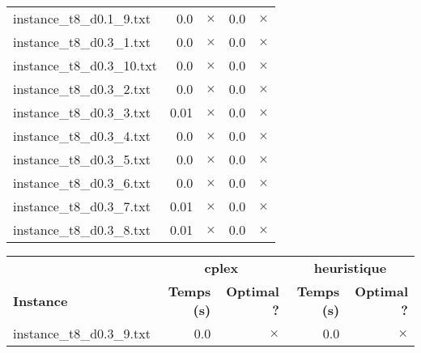 \documentclass{article}
\begin{document}
\begin{center}
\begin{tabular}{lrrrr}
instance\_t8\_d0.1\_9.txt & 0.0 & 
$\times$
 & 0.0 & 
$\times$
\\
instance\_t8\_d0.3\_1.txt & 0.0 & 
$\times$
 & 0.0 & 
$\times$
\\
instance\_t8\_d0.3\_10.txt & 0.0 & 
$\times$
 & 0.0 & 
$\times$
\\
instance\_t8\_d0.3\_2.txt & 0.0 & 
$\times$
 & 0.0 & 
$\times$
\\
instance\_t8\_d0.3\_3.txt & 0.01 & 
$\times$
 & 0.0 & 
$\times$
\\
instance\_t8\_d0.3\_4.txt & 0.0 & 
$\times$
 & 0.0 & 
$\times$
\\
instance\_t8\_d0.3\_5.txt & 0.0 & 
$\times$
 & 0.0 & 
$\times$
\\
instance\_t8\_d0.3\_6.txt & 0.0 & 
$\times$
 & 0.0 & 
$\times$
\\
instance\_t8\_d0.3\_7.txt & 0.01 & 
$\times$
 & 0.0 & 
$\times$
\\
instance\_t8\_d0.3\_8.txt & 0.01 & 
$\times$
 & 0.0 & 
$\times$
\\
\hline\end{tabular}
\end{center}

\newpage
\begin{center}
\renewcommand{\arraystretch}{1.4} 
 \begin{tabular}{lrrrr}
	\hline
 & \multicolumn{2}{c}{\textbf{cplex}} & \multicolumn{2}{c}{\textbf{heuristique}}\\
\textbf{Instance}  & \textbf{Temps (s)} & \textbf{Optimal ?}  & \textbf{Temps (s)} & \textbf{Optimal ?} \\\hline

instance\_t8\_d0.3\_9.txt & 0.0 & 
$\times$
 & 0.0 & 
$\times$
\\
\hline\end{tabular}
\end{center}
\end{document}
